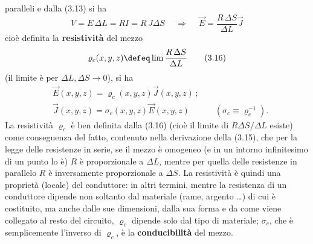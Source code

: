paralleli e dalla (3.13) si ha
\begin{equation}
  V=E\,\Delta L=RI=R\,J\Delta S
  \quad\ \Rightarrow\quad\ \vec E=\frac{R\,\Delta S}{\Delta L}\vec J
  \tag{3.15}
\end{equation}
cio\`e definita la \textbf{resistivit\`a} del mezzo
\begin{equation}
  \varrho_c(x,y,z)\defeq\lim\frac{R\,\Delta S}{\Delta L}
  \tag{3.16}
\end{equation}
(il limite \`e per $\Delta L,\Delta S\to0$), si ha
\begin{equation}
  \begin{aligned}
    &\vec E(x,y,z)=\varrho_c(x,y,z)\vec J(x,y,z)\,;\\
    &\vec J(x,y,z)=\sigma_c(x,y,z)\vec E(x,y,z)
    \qquad\quad(\sigma_c\equiv\varrho_c^{-1}).
  \end{aligned}
  \tag{3.17}
\end{equation}
La resistivit\`a $\varrho_c$ \`e ben definita dalla (3.16) (cio\`e il limite di
$R\Delta S/\Delta L$ esiste) come conseguenza del fatto, contenuto nella
derivazione della (3.15), che per la legge delle resistenze in serie, se il
mezzo \`e omogeneo (e in un intorno infinitesimo di un punto lo \`e) $R$ \`e
proporzionale a $\Delta L$, mentre per quella delle resistenze in parallelo $R$
\`e inversamente proporzionale a $\Delta S$. La resistivit\`a \`e quindi una
propriet\`a (locale) del conduttore: in altri termini, mentre la resistenza di
un conduttore dipende non soltanto dal materiale (rame, argento \dots) di cui
\`e costituito, ma anche dalle sue dimensioni, dalla sua forma e da come viene
collegato al resto del circuito, $\varrho_c$ dipende solo dal tipo di materiale;
$\sigma_c$, che \`e semplicemente l'inverso di $\varrho_c$, \`e la
\textbf{conducibilit\`a} del mezzo.

